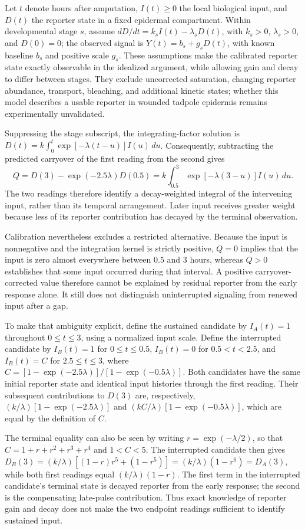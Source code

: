 \documentclass[11pt]{article}
\begin{document}
Let $t$ denote hours after amputation, $I(t)\geq 0$ the local biological input, and $D(t)$ the reporter state in a fixed epidermal compartment. Within developmental stage $s$, assume $dD/dt=k_sI(t)-\lambda_sD(t)$, with $k_s>0$, $\lambda_s>0$, and $D(0)=0$; the observed signal is $Y(t)=b_s+g_sD(t)$, with known baseline $b_s$ and positive scale $g_s$. These assumptions make the calibrated reporter state exactly observable in the idealized argument, while allowing gain and decay to differ between stages. They exclude uncorrected saturation, changing reporter abundance, transport, bleaching, and additional kinetic states; whether this model describes a usable reporter in wounded tadpole epidermis remains experimentally unvalidated.

Suppressing the stage subscript, the integrating-factor solution is $D(t)=k\int_0^t\exp[-\lambda(t-u)]I(u)\,du$. Consequently, subtracting the predicted carryover of the first reading from the second gives \[Q=D(3)-\exp(-2.5\lambda)D(0.5)=k\int_{0.5}^{3}\exp[-\lambda(3-u)]I(u)\,du.\] The two readings therefore identify a decay-weighted integral of the intervening input, rather than its temporal arrangement. Later input receives greater weight because less of its reporter contribution has decayed by the terminal observation.

Calibration nevertheless excludes a restricted alternative. Because the input is nonnegative and the integration kernel is strictly positive, $Q=0$ implies that the input is zero almost everywhere between $0.5$ and $3$ hours, whereas $Q>0$ establishes that some input occurred during that interval. A positive carryover-corrected value therefore cannot be explained by residual reporter from the early response alone. It still does not distinguish uninterrupted signaling from renewed input after a gap.

To make that ambiguity explicit, define the sustained candidate by $I_A(t)=1$ throughout $0\leq t\leq3$, using a normalized input scale. Define the interrupted candidate by $I_B(t)=1$ for $0\leq t\leq0.5$, $I_B(t)=0$ for $0.5<t<2.5$, and $I_B(t)=C$ for $2.5\leq t\leq3$, where $C=[1-\exp(-2.5\lambda)]/[1-\exp(-0.5\lambda)]$. Both candidates have the same initial reporter state and identical input histories through the first reading. Their subsequent contributions to $D(3)$ are, respectively, $(k/\lambda)[1-\exp(-2.5\lambda)]$ and $(kC/\lambda)[1-\exp(-0.5\lambda)]$, which are equal by the definition of $C$.

The terminal equality can also be seen by writing $r=\exp(-\lambda/2)$, so that $C=1+r+r^2+r^3+r^4$ and $1<C<5$. The interrupted candidate then gives $D_B(3)=(k/\lambda)[(1-r)r^5+(1-r^5)]=(k/\lambda)(1-r^6)=D_A(3)$, while both first readings equal $(k/\lambda)(1-r)$. The first term in the interrupted candidate's terminal state is decayed reporter from the early response; the second is the compensating late-pulse contribution. Thus exact knowledge of reporter gain and decay does not make the two endpoint readings sufficient to identify sustained input.
\end{document}
